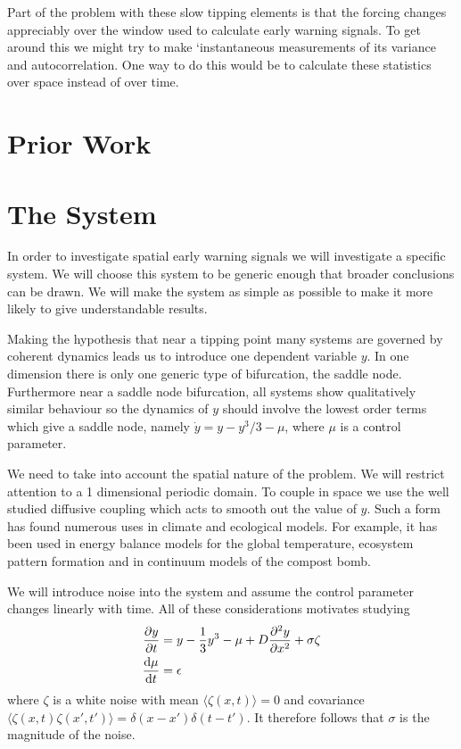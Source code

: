 Part of the problem with these slow tipping elements is that the forcing changes appreciably over the window used to calculate early warning signals.
To get around this we might try to make `instantaneous measurements of its variance and autocorrelation. One way to do this would be to calculate these
statistics over space instead of over time.

\section{Prior Work}

\section{The System}
In order to investigate spatial early warning signals we will investigate a specific system. We will choose this system
to be generic enough that broader conclusions can be drawn. We will make the system as simple as possible to make it more
likely to give understandable results.

Making the hypothesis that near a tipping point many systems are governed by coherent dynamics leads us to introduce one dependent
variable $y$. In one dimension there is only one generic type of bifurcation\cite{Thompson1994}, the saddle node. Furthermore
near a saddle node bifurcation, all systems show qualitatively similar behaviour\cite{guckenheimer2013} so the dynamics of $y$ should
involve the lowest order terms which give a saddle node, namely $\dot{y} = y - y^3/3 - \mu$, where $\mu$ is a control parameter.

We need to take into account the spatial nature of the problem. We will restrict attention to a 1 dimensional
periodic domain. To couple in space we use the well studied diffusive coupling which acts to smooth out the value of $y$.
Such a form has found numerous uses in climate and ecological models.
For example, it has been used in energy balance models for the global temperature\cite{Ghil1976}, ecosystem pattern formation\cite{Gowda2014}
and in continuum models of the compost bomb\cite{Clarke2021}.

We will introduce noise into the system and assume the control parameter changes linearly with time. All of these considerations motivates studying
\begin{subequations}
\label{eq:spatial_system}
  \begin{align}
    \pdv{y}{t} &= y - \frac{1}{3}y^3 - \mu + D\pdv[2]{y}{x} + \sigma\zeta \label{eq:spatial_system_y} \\
    \dv{\mu}{t}&= \epsilon \label{eq:spatial_system_mu}
  \end{align}
\end{subequations}
where $\zeta$ is a white noise with mean $\langle \zeta(x,t) \rangle = 0$ and covariance $\langle \zeta(x,t)\zeta(x',t')\rangle = \delta(x-x')\delta(t-t')$.
It therefore follows that $\sigma$ is the magnitude of the noise.

